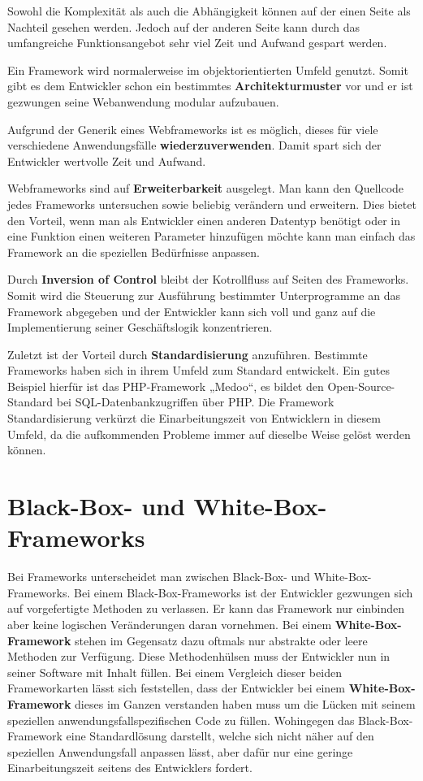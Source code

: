 Sowohl die Komplexität als auch die Abhängigkeit können auf der einen Seite als Nachteil gesehen werden. Jedoch auf der anderen Seite kann durch das umfangreiche Funktionsangebot sehr viel Zeit und Aufwand gespart werden.

Ein Framework wird normalerweise im objektorientierten Umfeld genutzt. Somit gibt es dem Entwickler schon ein bestimmtes \textbf{Architekturmuster} vor und er ist gezwungen seine Webanwendung modular aufzubauen.

Aufgrund der Generik eines Webframeworks ist es möglich, dieses für viele verschiedene Anwendungsfälle \textbf{wiederzuverwenden}. Damit spart sich der Entwickler wertvolle Zeit und Aufwand.

Webframeworks sind auf \textbf{Erweiterbarkeit} ausgelegt. Man kann den Quellcode jedes Frameworks untersuchen sowie beliebig verändern und erweitern. Dies bietet den Vorteil, wenn man als Entwickler einen anderen Datentyp benötigt oder in eine Funktion einen weiteren Parameter hinzufügen möchte kann man einfach das Framework an die speziellen Bedürfnisse anpassen.

Durch \textbf{Inversion of Control} bleibt der Kotrollfluss auf Seiten des Frameworks. Somit wird die Steuerung zur Ausführung bestimmter Unterprogramme an das Framework abgegeben und der Entwickler kann sich voll und ganz auf die Implementierung seiner Geschäftslogik konzentrieren.

Zuletzt ist der Vorteil durch \textbf{Standardisierung} anzuführen. Bestimmte Frameworks haben sich in ihrem Umfeld zum Standard entwickelt. Ein gutes Beispiel hierfür ist das PHP-Framework „Medoo“, es bildet den Open-Source-Standard bei SQL-Datenbankzugriffen über PHP. Die Framework Standardisierung verkürzt die Einarbeitungszeit von Entwicklern in diesem Umfeld, da die aufkommenden Probleme immer auf dieselbe Weise gelöst werden können.

\section{Black-Box- und White-Box-Frameworks}

Bei Frameworks unterscheidet man zwischen Black-Box- und White-Box-Frameworks. Bei einem Black-Box-Frameworks ist der Entwickler gezwungen sich auf vorgefertigte Methoden zu verlassen. Er kann das Framework nur einbinden aber keine logischen Veränderungen daran vornehmen. Bei einem \textbf{White-Box-Framework} stehen im Gegensatz dazu oftmals nur abstrakte oder leere Methoden zur Verfügung. Diese Methodenhülsen muss der Entwickler nun in seiner Software mit Inhalt füllen. Bei einem Vergleich dieser beiden Frameworkarten lässt sich feststellen, dass der Entwickler bei einem \textbf{White-Box-Framework} dieses im Ganzen verstanden haben muss um die Lücken mit seinem speziellen anwendungsfallspezifischen Code zu füllen. Wohingegen das Black-Box-Framework eine Standardlösung darstellt, welche sich nicht näher auf den speziellen Anwendungsfall anpassen lässt, aber dafür nur eine geringe Einarbeitungszeit seitens des Entwicklers fordert.


